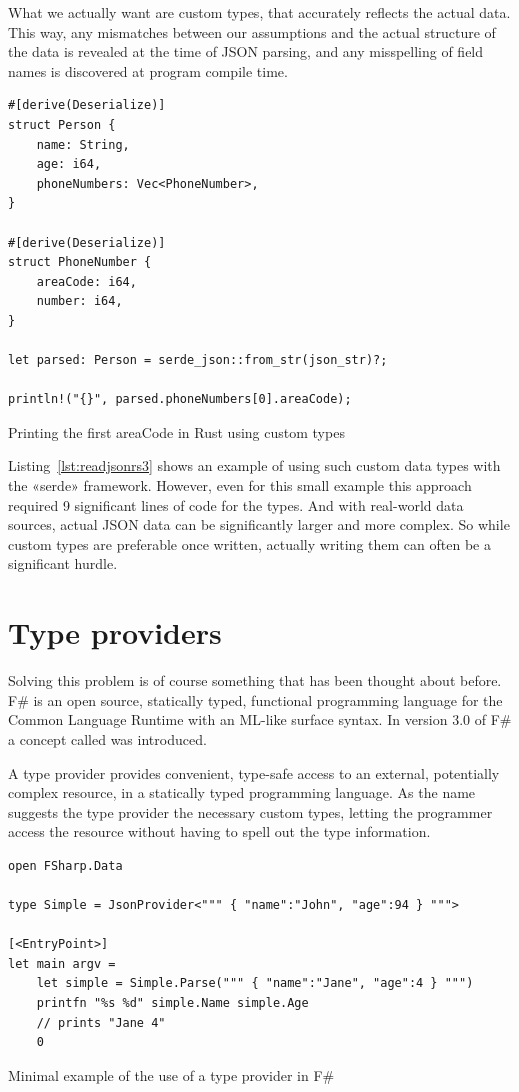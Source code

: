 What we actually want are custom types, that accurately reflects the actual data. This way, any mismatches between our assumptions and the actual structure of the data is revealed at the time of JSON parsing, and any misspelling of field names is discovered at program compile time.

\begin{listing}[ht!]
\begin{verbatim}
#[derive(Deserialize)]
struct Person {
    name: String,
    age: i64,
    phoneNumbers: Vec<PhoneNumber>,
}

#[derive(Deserialize)]
struct PhoneNumber {
    areaCode: i64,
    number: i64,
}

let parsed: Person = serde_json::from_str(json_str)?;

println!("{}", parsed.phoneNumbers[0].areaCode);
\end{verbatim}
\caption{Printing the first areaCode in Rust using custom types}
\label{lst:readjsonrs3}
\end{listing}

Listing~\ref{lst:readjsonrs3} shows an example of using such custom data types with the «serde» framework. However, even for this small example this approach required 9 significant lines of code for the types. And with real-world data sources, actual JSON data can be significantly larger and more complex. So while custom types are preferable once written, actually writing them can often be a significant hurdle.

\section{Type providers}
\label{sec:type-providers}

Solving this problem is of course something that has been thought about before. F\# is an open source, statically typed, functional programming language for the Common Language Runtime with an ML-like surface syntax. In version 3.0 of F\# a concept called  was introduced.

A type provider provides convenient, type-safe access to an external, potentially complex resource, in a statically typed programming language. As the name suggests the type provider  the necessary custom types, letting the programmer access the resource without having to spell out the type information.

\begin{listing}[ht!]
\begin{verbatim}
open FSharp.Data

type Simple = JsonProvider<""" { "name":"John", "age":94 } """>

[<EntryPoint>]
let main argv =
    let simple = Simple.Parse(""" { "name":"Jane", "age":4 } """)
    printfn "%s %d" simple.Name simple.Age
    // prints "Jane 4"
    0
\end{verbatim}
\caption{Minimal example of the use of a type provider in F\#}
\label{lst:fsharpsample}
\end{listing}


